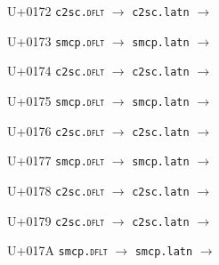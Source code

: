 \documentclass{article}
\begin{document}
\begin{substitutions}
\goodbreak

U+0172  \linebreak
    \texttt{c2sc.\textsc{dflt}} $\to$  \linebreak
    \texttt{c2sc.latn} $\to$  

\goodbreak

U+0173  \linebreak
    \texttt{smcp.\textsc{dflt}} $\to$  \linebreak
    \texttt{smcp.latn} $\to$  

\goodbreak

U+0174  \linebreak
    \texttt{c2sc.\textsc{dflt}} $\to$  \linebreak
    \texttt{c2sc.latn} $\to$  

\goodbreak

U+0175  \linebreak
    \texttt{smcp.\textsc{dflt}} $\to$  \linebreak
    \texttt{smcp.latn} $\to$  

\goodbreak

U+0176  \linebreak
    \texttt{c2sc.\textsc{dflt}} $\to$  \linebreak
    \texttt{c2sc.latn} $\to$  

\goodbreak

U+0177  \linebreak
    \texttt{smcp.\textsc{dflt}} $\to$  \linebreak
    \texttt{smcp.latn} $\to$  

\goodbreak

U+0178  \linebreak
    \texttt{c2sc.\textsc{dflt}} $\to$  \linebreak
    \texttt{c2sc.latn} $\to$  

\goodbreak

U+0179  \linebreak
    \texttt{c2sc.\textsc{dflt}} $\to$  \linebreak
    \texttt{c2sc.latn} $\to$  

\goodbreak

U+017A  \linebreak
    \texttt{smcp.\textsc{dflt}} $\to$  \linebreak
    \texttt{smcp.latn} $\to$  


\end{substitutions}
\end{document}
